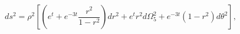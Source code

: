 \begin{equation}
ds^2 = \rho^2\left[ \left(e^t+e^{-3t}\frac{r^2}{1-r^2}\right)dr^2+e^tr^2d\Omega_5^2+e^{-3t}(1-r^2)d\theta^2
       \right],
\end{equation}

